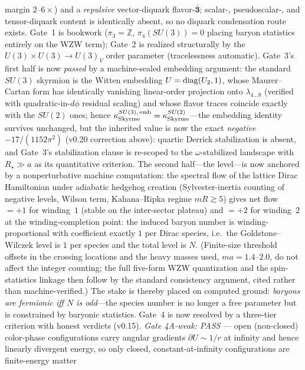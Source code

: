 \documentclass[11pt,a4paper]{article}
\begin{document}
margin $2$--$6\times$) and a \emph{repulsive} vector-diquark
flavor-$\bar{\mathbf{3}}$; scalar-, pseudoscalar-, and
tensor-diquark content is identically absent, so no diquark
condensation route exists.
Gate~1 is bookwork ($\pi_3 = \mathbb{Z}$, $\pi_4(SU(3)) = 0$
placing baryon statistics entirely on the WZW term); Gate~2 is
realized structurally by the $U(3)\times U(3) \to U(3)_V$ order
parameter (tracelessness automatic).  Gate~3's first half is now \emph{passed} by a machine-sealed
embedding argument: the standard $SU(3)$ skyrmion is the Witten
embedding $U = {\rm diag}(U_2, 1)$, whose Maurer--Cartan form has
identically vanishing linear-order projection onto
$\lambda_{4\ldots 8}$ (verified with quadratic-in-$d\phi$
residual scaling) and whose flavor traces coincide exactly with
the $SU(2)$ ones; hence
$\kappa_{\rm Skyrme}^{SU(3),\,{\rm emb}} =
\kappa_{\rm Skyrme}^{SU(2)}$---the embedding identity survives
unchanged, but the inherited value is now the exact
\emph{negative} $-17/(1152\pi^2)$ (v0.20 correction above):
quartic Derrick stabilization is absent, and Gate~3's
stabilization clause is re-scoped to the $\omega$-stabilized
landscape with $R_\star \gg a$ as its quantitative criterion.  The second half---the level---is now anchored by a
nonperturbative machine computation: the spectral flow of the
lattice Dirac Hamiltonian under adiabatic hedgehog creation
(Sylvester-inertia counting of negative levels, Wilson term,
Kahana--Ripka regime $mR \gtrsim 5$) gives net flow $= +1$ for
winding~$1$ (stable on the inter-sector plateau) and $= +2$ for
winding~$2$ at the winding-completion point: the induced baryon
number is winding-proportional with coefficient exactly $1$ per
Dirac species, i.e.\ the Goldstone--Wilczek level is $1$ per
species and the total level is $N$.  (Finite-size threshold
offsets in the crossing locations and the heavy masses used,
$ma = 1.4$--$2.0$, do not affect the integer counting; the full
five-form WZW quantization and the spin-statistics linkage then
follow by the standard consistency argument, cited rather than
machine-verified.)  The stake is thereby placed on computed
ground: \emph{baryons are fermionic iff $N$ is odd}---the species
number is no longer a free parameter but is constrained by
baryonic statistics.
Gate~4 is now resolved by a three-tier criterion with honest
verdicts (v0.15).
\emph{Gate 4A-weak: PASS} --- open (non-closed) color-phase
configurations carry angular gradients $\partial U \sim 1/r$ at
infinity and hence linearly divergent energy, so only closed,
constant-at-infinity configurations are finite-energy matter
\end{document}
